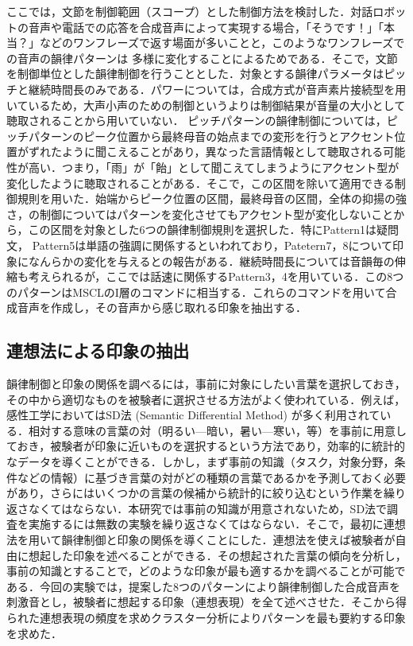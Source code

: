\documentclass[japanese]{jnlp_1.4}
\begin{document}
ここでは，文節を制御範囲（スコープ）とした制御方法を検討した．対話ロボットの音声や電話での応答を合成音声によって実現する場合，「そうです！」「本当？」などのワンフレーズで返す場面が多いことと，このようなワンフレーズでの音声の韻律パターンは
多様に変化することによるためである．そこで，文節を制御単位とした韻律制御を行うこととした．対象とする韻律パラメータはピッチと継続時間長のみである．パワーについては，合成方式が音声素片接続型を用いているため，大声小声のための制御というよりは制御結果が音量の大小として聴取されることから用いていない．
ピッチパターンの韻律制御については，ピッチパターンのピーク位置から最終母音の始点までの変形を行うとアクセント位置がずれたように聞こえることがあり，異なった言語情報として聴取される可能性が高い．つまり，「雨」が「飴」として聞こえてしまうようにアクセント型が変化したように聴取されることがある．そこで，この区間を除いて適用できる制御規則を用いた．始端からピーク位置の区間，最終母音の区間，全体の抑揚の強さ，の制御についてはパターンを変化させてもアクセント型が変化しないことから，この区間を対象とした6つの韻律制御規則を選択した．特にPattern1は疑問文， Pattern5は単語の強調に関係するといわれており，Patetern7，8について印象になんらかの変化を与える\cite{Kawakami}との報告がある．継続時間長については音韻毎の伸縮も考えられるが，ここでは話速に関係するPattern3，4を用いている．この8つのパターンはMSCLのI層のコマンドに相当する．これらのコマンドを用いて合成音声を作成し，その音声から感じ取れる印象を抽出する．


\subsection{連想法による印象の抽出}

韻律制御と印象の関係を調べるには，事前に対象にしたい言葉を選択しておき，その中から適切なものを被験者に選択させる方法がよく使われている．例えば，感性工学においてはSD法 (Semantic Differential Method) が多く利用されている．相対する意味の言葉の対（明るい—暗い，暑い—寒い，等）を事前に用意しておき，被験者が印象に近いものを選択するという方法であり，効率的に統計的なデータを導くことができる．しかし，まず事前の知識（タスク，対象分野，条件などの情報）に基づき言葉の対がどの種類の言葉であるかを予測しておく必要があり，さらにはいくつかの言葉の候補から統計的に絞り込むという作業を繰り返さなくてはならない．本研究では事前の知識が用意されないため，SD法で調査を実施するには無数の実験を繰り返さなくてはならない．そこで，最初に連想法を用いて韻律制御と印象の関係を導くことにした．連想法を使えば被験者が自由に想起した印象を述べることができる．その想起された言葉の傾向を分析し，事前の知識とすることで，どのような印象が最も適するかを調べることが可能である．今回の実験では，提案した8つのパターンにより韻律制御した合成音声を刺激音とし，被験者に想起する印象（連想表現）を全て述べさせた．そこから得られた連想表現の頻度を求めクラスター分析によりパターンを最も要約する印象を求めた．
\end{document}
